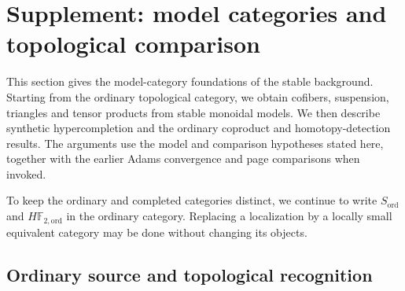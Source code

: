 \section{Supplement: model categories and topological comparison}

This section gives the model-category foundations of the stable
background. Starting from the ordinary topological category, we obtain
cofibers, suspension, triangles and tensor products from stable monoidal
models. We then describe synthetic hypercompletion and the ordinary
coproduct and homotopy-detection results. The arguments use the model and comparison hypotheses stated here,
together with the earlier Adams convergence and page comparisons when invoked.

To keep the ordinary and completed categories distinct, we continue to
write $S_{\mathrm{ord}}$ and $H\mathbb F_{2,\mathrm{ord}}$ in the
ordinary category. Replacing a localization by a locally small equivalent
category may be done without changing its objects.

\subsection*{Ordinary source and topological recognition}

